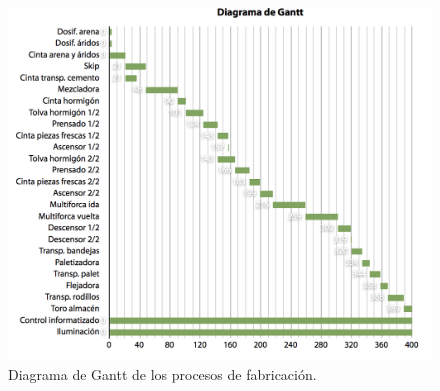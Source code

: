 \begin{figure}[!htb]
\centering
\includegraphics[width=15cm]{img/gantt.png}
\caption{Diagrama de Gantt de los procesos de fabricación.}
\label{fig:gant}
\end{figure}
